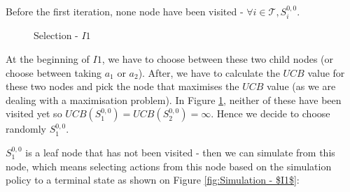 Before the first iteration, none node have been visited - $\forall i \in \mathcal{T}, S^{0,0}_{i}$.
\begin{figure}[!ht]
    \centering
    \caption{Selection - $I1$}
    \label{fig:Expansion of the tree from the root node}
\end{figure}
At the beginning of $I1$, we have to choose between these two child nodes (or choose between taking $a_1$ or $a_2$). After, we have to calculate the $UCB$ value for these two nodes and pick the node that maximises the $UCB$ value (as we are dealing with a maximisation problem).
In Figure \ref{fig:Expansion of the tree from the root node}, neither of these have been visited yet so $UCB(S^{0,0}_1)=UCB(S^{0,0}_2)=\infty$. Hence we decide to choose randomly $S^{0,0}_1$.

$S^{0,0}_1$ is a leaf node that has not been visited - then we can simulate from this node, which means selecting actions from this node based on the simulation policy to a terminal state as shown on Figure \ref{fig:Simulation - $I1$}:

